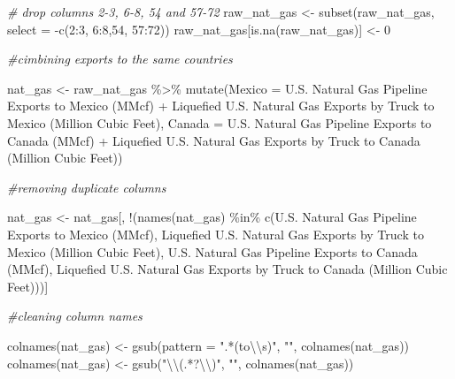 \documentclass[
]{article}
\newenvironment{Shaded}{\begin{snugshade}}{\end{snugshade}}
\newcommand{\AttributeTok}[1]{\textcolor[rgb]{0.77,0.63,0.00}{#1}}
\newcommand{\CommentTok}[1]{\textcolor[rgb]{0.56,0.35,0.01}{\textit{#1}}}
\newcommand{\DecValTok}[1]{\textcolor[rgb]{0.00,0.00,0.81}{#1}}
\newcommand{\FunctionTok}[1]{\textcolor[rgb]{0.00,0.00,0.00}{#1}}
\newcommand{\NormalTok}[1]{#1}
\newcommand{\OtherTok}[1]{\textcolor[rgb]{0.56,0.35,0.01}{#1}}
\newcommand{\SpecialCharTok}[1]{\textcolor[rgb]{0.00,0.00,0.00}{#1}}
\newcommand{\StringTok}[1]{\textcolor[rgb]{0.31,0.60,0.02}{#1}}
\begin{document}
\begin{Shaded}
\begin{Highlighting}[]
\CommentTok{\# drop columns 2{-}3, 6{-}8, 54 and 57{-}72}
\NormalTok{raw\_nat\_gas }\OtherTok{\textless{}{-}} \FunctionTok{subset}\NormalTok{(raw\_nat\_gas, }\AttributeTok{select =} \SpecialCharTok{{-}}\FunctionTok{c}\NormalTok{(}\DecValTok{2}\SpecialCharTok{:}\DecValTok{3}\NormalTok{, }\DecValTok{6}\SpecialCharTok{:}\DecValTok{8}\NormalTok{,}\DecValTok{54}\NormalTok{, }\DecValTok{57}\SpecialCharTok{:}\DecValTok{72}\NormalTok{))}
\NormalTok{raw\_nat\_gas[}\FunctionTok{is.na}\NormalTok{(raw\_nat\_gas)] }\OtherTok{\textless{}{-}} \DecValTok{0}

\CommentTok{\#cimbining exports to the same countries}

\NormalTok{nat\_gas }\OtherTok{\textless{}{-}}\NormalTok{ raw\_nat\_gas }\SpecialCharTok{\%\textgreater{}\%}
  \FunctionTok{mutate}\NormalTok{(}\AttributeTok{Mexico =} \StringTok{\textasciigrave{}}\AttributeTok{U.S. Natural Gas Pipeline Exports to Mexico (MMcf)}\StringTok{\textasciigrave{}} \SpecialCharTok{+} \StringTok{\textasciigrave{}}\AttributeTok{Liquefied U.S. Natural Gas Exports by Truck to Mexico (Million Cubic Feet)}\StringTok{\textasciigrave{}}\NormalTok{,}
         \AttributeTok{Canada =} \StringTok{\textasciigrave{}}\AttributeTok{U.S. Natural Gas Pipeline Exports to Canada (MMcf)}\StringTok{\textasciigrave{}} \SpecialCharTok{+} \StringTok{\textasciigrave{}}\AttributeTok{Liquefied U.S. Natural Gas Exports by Truck to Canada (Million Cubic Feet)}\StringTok{\textasciigrave{}}\NormalTok{)}

\CommentTok{\#removing duplicate columns}

\NormalTok{nat\_gas }\OtherTok{\textless{}{-}}\NormalTok{ nat\_gas[, }\SpecialCharTok{!}\NormalTok{(}\FunctionTok{names}\NormalTok{(nat\_gas) }\SpecialCharTok{\%in\%} \FunctionTok{c}\NormalTok{(}\StringTok{\textquotesingle{}U.S. Natural Gas Pipeline Exports to Mexico (MMcf)\textquotesingle{}}\NormalTok{,}
                                             \StringTok{\textquotesingle{}Liquefied U.S. Natural Gas Exports by Truck to Mexico (Million Cubic Feet)\textquotesingle{}}\NormalTok{,}
                                             \StringTok{\textquotesingle{}U.S. Natural Gas Pipeline Exports to Canada (MMcf)\textquotesingle{}}\NormalTok{,}
                                             \StringTok{\textquotesingle{}Liquefied U.S. Natural Gas Exports by Truck to Canada (Million Cubic Feet)\textquotesingle{}}\NormalTok{))]}

\CommentTok{\#cleaning column names}

\FunctionTok{colnames}\NormalTok{(nat\_gas) }\OtherTok{\textless{}{-}} \FunctionTok{gsub}\NormalTok{(}\AttributeTok{pattern =} \StringTok{".*(to}\SpecialCharTok{\textbackslash{}\textbackslash{}}\StringTok{s)"}\NormalTok{, }\StringTok{""}\NormalTok{, }\FunctionTok{colnames}\NormalTok{(nat\_gas))}
\FunctionTok{colnames}\NormalTok{(nat\_gas) }\OtherTok{\textless{}{-}} \FunctionTok{gsub}\NormalTok{(}\StringTok{"}\SpecialCharTok{\textbackslash{}\textbackslash{}}\StringTok{(.*?}\SpecialCharTok{\textbackslash{}\textbackslash{}}\StringTok{)"}\NormalTok{, }\StringTok{""}\NormalTok{, }\FunctionTok{colnames}\NormalTok{(nat\_gas))}


\end{Highlighting}
\end{Shaded}
\end{document}
